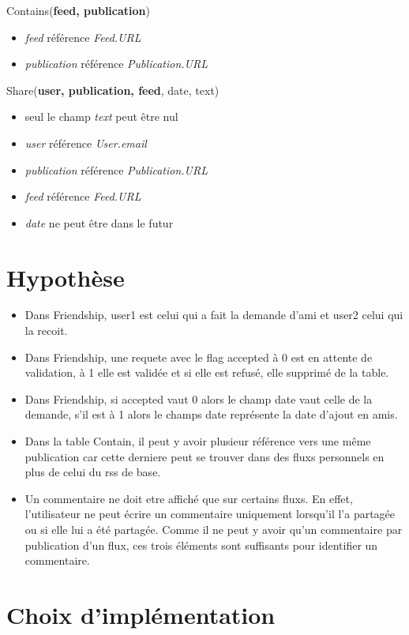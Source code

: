 \documentclass[a4paper,10pt]{article}
\begin{document}
        Contains(\textbf{feed, publication})
        \begin{itemize}            
            \item \textit{feed} référence \textit{Feed.URL}
            \item \textit{publication} référence \textit{Publication.URL}
        \end{itemize}
            
        Share(\textbf{user, publication, feed}, date, text)
        \begin{itemize}
			\item seul le champ \textit{text} peut être nul
            \item \textit{user} référence \textit{User.email}
            \item \textit{publication} référence \textit{Publication.URL}
            \item \textit{feed} référence \textit{Feed.URL}
            \item \textit{date} ne peut être dans le futur
        \end{itemize}
		
\section{Hypothèse}
\begin{itemize}
\item Dans Friendship, user1 est celui qui a fait la demande d'ami et user2 celui qui la recoit.
\item Dans Friendship, une requete avec le flag accepted à 0 est en attente de validation, à 1 elle est validée et si elle est refusé, elle supprimé de la table.
\item Dans Friendship, si accepted vaut 0 alors le champ date vaut celle de la demande, s'il est à 1 alors le champs date représente la date d'ajout en amis.
\item Dans la table Contain, il peut y avoir plusieur référence vers une même publication car cette derniere peut se trouver dans des fluxs personnels en plus de celui du rss de base.
\item Un commentaire ne doit etre affiché que sur certains fluxs. En effet, l'utilisateur ne peut écrire un commentaire uniquement lorsqu'il l'a partagée ou si elle lui a été partagée. Comme il ne peut y avoir qu'un commentaire par publication d'un flux, ces trois éléments sont suffisants pour identifier un commentaire.
\end{itemize}
\section{Choix d'implémentation}
\end{document}
